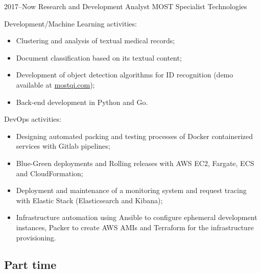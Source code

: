 \documentclass[a4paper]{cv-friggeri-x}
\begin{document}
\begin{entrylist}


\entry
    {2017--Now}
    {Research and Development Analyst}
    {MOST Specialist Technologies}
    {Development/Machine Learning activities:
    \begin{itemize}
        \item Clustering and analysis of textual medical records;
        \item Document classification based on its textual content;
        \item Development of object detection algorithms for ID recognition (demo available at \href{mostqi.com}{mostqi.com});
        \item Back-end development in Python and Go.
    \end{itemize}
    DevOps activities:
    \begin{itemize}
        \item Designing automated packing and testing processes of Docker containerized services with Gitlab pipelines;
        \item Blue-Green deployments and Rolling releases with AWS EC2, Fargate, ECS and CloudFormation;
        \item Deployment and maintenance of a monitoring system and request tracing with Elastic Stack (Elasticsearch and Kibana);
        \item Infrastructure automation using Ansible to configure ephemeral development instances, Packer to create AWS AMIs and Terraform for the infrastructure provisioning.
    \end{itemize}}


\end{entrylist}


\subsection{Part time}
\end{document}

